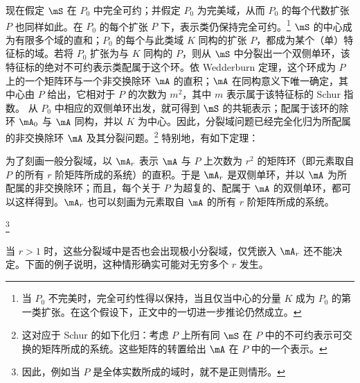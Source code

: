 现在假定 $\mS$ 在 $P_0$ 中完全可约；并假定 $P_0$ 为完美域，从而 $P_0$ 的每个代数扩张 $P$ 也同样如此。在 $P_0$ 的每个扩张 $P$ 下，表示类仍保持完全可约。\footnote{当 $P_0$ 不完美时，完全可约性得以保持，当且仅当中心的分量 $K$ 成为 $P_0$ 的\guillemotright{}第一类扩张\guillemotleft{}。在这个假设下，正文中的一切进一步推论仍然成立。} $\mS$ 的中心成为有限多个域的直和；$P_0$ 的每个与此类域 $K$ 同构的扩张 $P$，都成为某个（单）特征标的域。若将 $P_0$ 扩张为与 $K$ 同构的 $P$，则从 $\mS$ 中分裂出一个双侧单环，该特征标的绝对不可约表示类配属于这个环。依 Wedderburn 定理，这个环成为 $P$ 上的一个矩阵环与一个非交换除环 $\mA$ 的直积；$\mA$ 在同构意义下唯一确定，其中心由 $P$ 给出，它相对于 $P$ 的次数为 $m^2$，其中 $m$ 表示属于该特征标的 Schur 指数。 从 $P_0$ 中相应的双侧单环出发，就可得到 $\mS$ 的共轭表示；配属于该环的除环 $\mA_0$ 与 $\mA$ 同构，并以 $K$ 为中心。因此，分裂域问题已经完全化归为所配属的非交换除环 $\mA$ 及其分裂问题。\footnote{这对应于 Schur 的如下化归：考虑 $P$ 上所有同 $\mS$ 在 $P$ 中的不可约表示可交换的矩阵所成的系统。这些矩阵的转置给出 $\mA$ 在 $P$ 中的一个表示。} 特别地，有如下定理：


为了刻画一般分裂域，以 $\mA_r$ 表示 $\mA$ 与 $P$ 上次数为 $r^2$ 的矩阵环（即元素取自 $P$ 的所有 $r$ 阶矩阵所成的系统）的直积。于是 $\mA_r$ 是双侧单环，并以 $\mA$ 为所配属的非交换除环；而且，每个关于 $P$ 为超复的、配属于 $\mA$ 的双侧单环，都可以这样得到。$\mA_r$ 也可以刻画为元素取自 $\mA$ 的所有 $r$ 阶矩阵所成的系统。

\footnote{因此，例如当 $P$ 是全体实数所成的域时，就不是正则情形。}

当 $r>1$ 时，这些分裂域中是否也会出现极小分裂域，仅凭嵌入 $\mA_r$ 还不能决定。下面的例子说明，这种情形确实可能对无穷多个 $r$ 发生。
